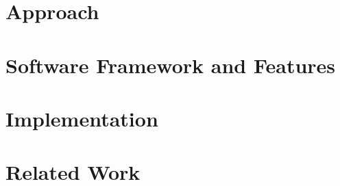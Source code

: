 \documentclass[preprint]{elsarticle}
\begin{document}
\section{Approach}
\label{sec:pamproc}


\section{Software Framework and Features}
\label{sec:architecture}


\section{Implementation}
\label{sec:implementation}


%


\label{sec:Experimentations}


\section{Related Work}
\label{sec:related}


%

%

%

%






\end{document}
